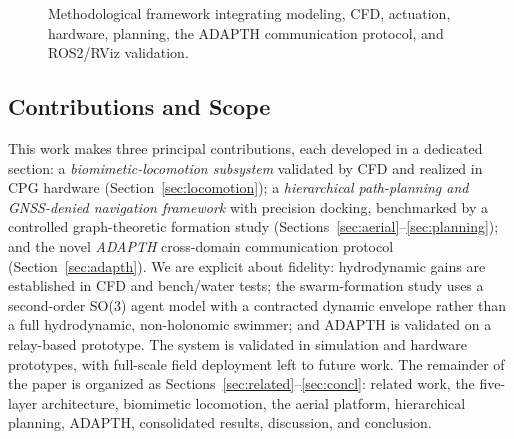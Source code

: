 \documentclass[journal]{IEEEtran}
\begin{document}
\begin{figure}[!t]
\centering
{}
\caption{Methodological framework integrating modeling, CFD, actuation, hardware,
planning, the ADAPTH communication protocol, and ROS2/RViz validation.}
\label{fig:method}
\end{figure}

\subsection{Contributions and Scope}
This work makes three principal contributions, each developed in a dedicated
section: a \emph{biomimetic-locomotion subsystem} validated by CFD and realized
in CPG hardware (Section~\ref{sec:locomotion}); a \emph{hierarchical
path-planning and GNSS-denied navigation framework} with precision docking,
benchmarked by a controlled graph-theoretic formation study
(Sections~\ref{sec:aerial}--\ref{sec:planning}); and the novel \emph{ADAPTH}
cross-domain communication protocol (Section~\ref{sec:adapth}). We are explicit
about fidelity: hydrodynamic gains are established in CFD and bench/water tests;
the swarm-formation study uses a second-order SO(3) agent model with a contracted
dynamic envelope rather than a full hydrodynamic, non-holonomic swimmer; and
ADAPTH is validated on a relay-based prototype. The system is validated in
simulation and hardware prototypes, with full-scale field deployment left to
future work. The remainder of the paper is organized as
Sections~\ref{sec:related}--\ref{sec:concl}: related work, the five-layer
architecture, biomimetic locomotion, the aerial platform, hierarchical planning,
ADAPTH, consolidated results, discussion, and conclusion.
\end{document}
